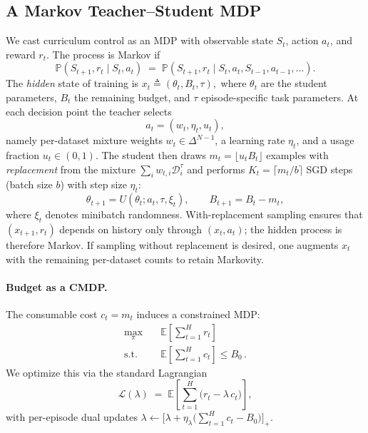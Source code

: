\documentclass[11pt]{article}
\newcommand{\E}{\mathbb{E}}
\newcommand{\1}{\mathbf{1}}
\newcommand{\Prb}{\mathbb{P}}
\begin{document}
\subsection{A Markov Teacher--Student MDP}\label{sec:mdp}
We cast curriculum control as an MDP with observable state $S_t$, action $a_t$, and reward $r_t$. The process is Markov if
\begin{equation}
\Prb(S_{t+1}, r_t \mid S_t, a_t) \;=\; \Prb(S_{t+1}, r_t \mid S_t, a_t, S_{t-1}, a_{t-1}, \dots).
\label{eq:markov}
\end{equation}
The \emph{hidden} state of training is
\(
x_t \triangleq (\theta_t, B_t, \tau),
\)
where $\theta_t$ are the student parameters, $B_t$ the remaining budget, and $\tau$ episode-specific task parameters. At each decision point the teacher selects
\[
a_t=(w_t,\eta_t,u_t),
\]
namely per-dataset mixture weights $w_t\in\Delta^{N-1}$, a learning rate $\eta_t$, and a usage fraction $u_t\in(0,1)$. The student then draws $m_t=\lfloor u_t B_t\rfloor$ examples with \emph{replacement} from the mixture $\sum_i w_{t,i}\mathcal{D}_i^\tau$ and performs $K_t=\lceil m_t/b\rceil$ SGD steps (batch size $b$) with step size $\eta_t$:
\begin{equation}
\theta_{t+1} = U(\theta_t; a_t,\tau,\xi_t), \qquad B_{t+1}=B_t-m_t,
\end{equation}
where $\xi_t$ denotes minibatch randomness. With-replacement sampling ensures that $(x_{t+1},r_t)$ depends on history only through $(x_t,a_t)$; the hidden process is therefore Markov. If sampling without replacement is desired, one augments $x_t$ with the remaining per-dataset counts to retain Markovity.

\paragraph{Budget as a CMDP.}
The consumable cost $c_t=m_t$ induces a constrained MDP:
\begin{equation}
\label{eq:cmdp}
\begin{aligned}
\max_{\pi}\quad & \E\!\left[\sum_{t=1}^{H} r_t\right] \\
\text{s.t.}\quad & \E\!\left[\sum_{t=1}^{H} c_t\right] \le B_0 \, .
\end{aligned}
\end{equation}
We optimize this via the standard Lagrangian
\begin{equation}
\label{eq:lagrangian}
\mathcal{L}(\lambda) \;=\; \E\!\left[\sum_{t=1}^{H} \big(r_t-\lambda\,c_t\big)\right],
\end{equation}
with per-episode dual updates $\lambda \leftarrow \big[\lambda + \eta_\lambda\big(\sum_{t=1}^{H} c_t - B_0\big)\big]_+$.
\end{document}
